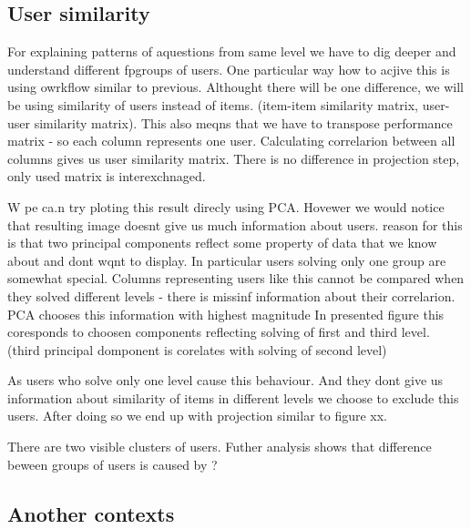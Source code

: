 \documentclass[
  digital, %
  table,   %
  nolof,     %
  nolot,     %
  nocover
]{fithesis3}
\begin{document}
\subsection{User similarity}\label{user-similarity}


For explaining patterns of aquestions from same level we have to dig
deeper and understand different fpgroups of users. One particular way
how to acjive this is using owrkflow similar to previous. Althought
there will be one difference, we will be using similarity of users
instead of items. (item-item similarity matrix, user-user similarity
matrix). This also meqns that we have to transpose performance matrix -
so each column represents one user. Calculating correlarion between all
columns gives us user similarity matrix. There is no difference in
projection step, only used matrix is interexchnaged.

W pe ca.n try ploting this result direcly using PCA. Hovewer we would
notice that resulting image doesnt give us much information about users.
reason for this is that two principal components reflect some property
of data that we know about and dont wqnt to display. In particular users
solving only one group are somewhat special. Columns representing users
like this cannot be compared when they solved different levels - there
is missinf information about their correlarion. PCA chooses this
information with highest magnitude In presented figure this coresponds
to choosen components reflecting solving of first and third level.
(third principal domponent is corelates with solving of second level)

As users who solve only one level cause this behaviour. And they dont
give us information about similarity of items in different levels we
choose to exclude this users. After doing so we end up with projection
similar to figure xx.

There are two visible clusters of users. Futher analysis shows that
difference beween groups of users is caused by ?

\subsection{Another contexts}\label{another-contexts}


\end{document}
